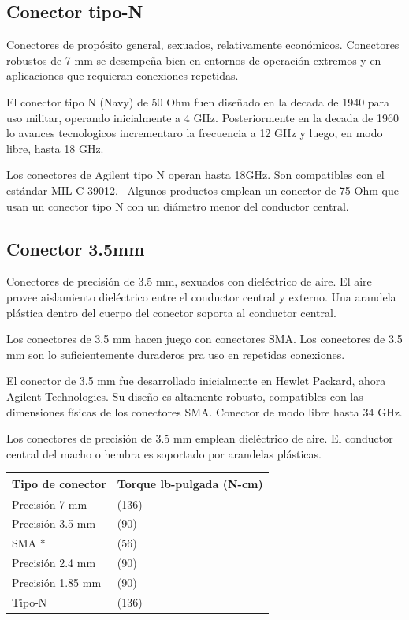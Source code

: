\documentclass{article}
\begin{document}
	\subsection{Conector tipo-N}
	
	Conectores de propósito general, sexuados, relativamente económicos. Conectores robustos de 7 mm se desempeña bien en
	entornos de operación extremos y en aplicaciones que requieran conexiones repetidas.
	
	El conector tipo N (Navy) de 50 Ohm fuen diseñado en la decada de 1940 para uso militar, operando inicialmente a 4 GHz.
	Posteriormente en la decada de 1960 lo avances tecnologicos incrementaro la frecuencia a 12 GHz y luego, en modo libre,
	hasta 18 GHz.
	
	Los conectores de Agilent tipo N operan hasta 18GHz. Son compatibles con el estándar MIL-C-39012. \ Algunos productos
	emplean un conector de 75 Ohm que usan un conector tipo N con un diámetro menor del conductor central.		
	
	\subsection{Conector 3.5mm}
	
	Conectores de precisión de 3.5 mm, sexuados con dieléctrico de aire. El aire provee aislamiento dieléctrico entre el
	conductor central y externo. Una arandela plástica dentro del cuerpo del conector soporta al conductor central.
	
	Los conectores de 3.5 mm hacen juego con conectores SMA. Los conectores de 3.5 mm son lo suficientemente duraderos pra
	uso en repetidas conexiones.
	
	El conector de 3.5 mm fue desarrollado inicialmente en Hewlet Packard, ahora Agilent Technologies. Su diseño es
	altamente robusto, compatibles con las dimensiones físicas de los conectores SMA. Conector de modo libre hasta 34 GHz. 
	
	Los conectores de precisión de 3.5 mm emplean dieléctrico de aire. El conductor central del macho o hembra es soportado
	por arandelas plásticas.
	
	\begin{center}
		\tablefirsthead{}
		\tablehead{}
		\tabletail{}
		\tablelasttail{}
		\begin{supertabular}{|m{2.952cm}|m{4.323cm}|}
			\hline
			\centering Tipo de conector &
			\centering Torque lb-pulgada (N-cm)\\\hline
			\centering Precisión 7 mm &
			 (136)\\\hline
			\centering Precisión 3.5 mm &
			 (90)\\\hline
			\centering SMA * &
			 (56)\\\hline
			\centering Precisión 2.4 mm &
			 (90)\\\hline
			\centering Precisión 1.85 mm &
			 (90)\\\hline
			\centering Tipo-N &
			 (136)\\\hline
		\end{supertabular}
	\end{center}
\end{document}
